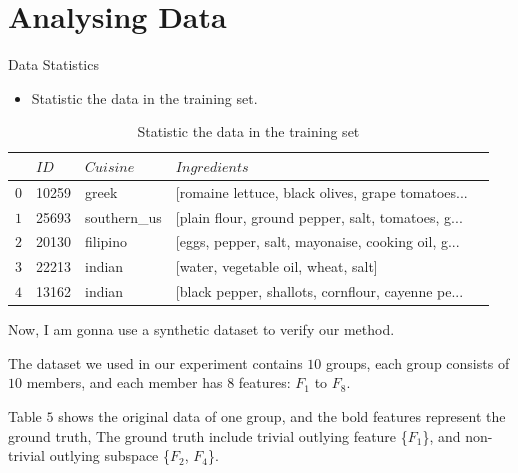 \documentclass[
 size=14pt,
 paper=smartboard,  %
 mode=present, 		%
 display=slides, 	%
 style=tuliplab,  	%
 pauseslide,
 fleqn,leqno]{powerdot}
\begin{document}
\section{Analysing Data}


\begin{slide}{Data Statistics}

  \begin{itemize}
  \item Statistic the data in the training set.
  \end{itemize}
  
  \begin{table}
  \setlength{\abovecaptionskip}{0pt}
  \setlength{\belowcaptionskip}{10pt}
  \centering
  \caption{Statistic the data in the training set}
  
  \begin{tabular}{p{0.5cm}p{2.1cm}p{2.5cm}p{10.2cm}p{2.2cm}}
  \hline
      & $ID$ & $Cuisine$ & $Ingredients$  \\
  \hline
    $0$   & 10259 & greek  & [romaine lettuce, black olives, grape tomatoes... \\
    $1$   & 25693  & southern_us  & [plain flour, ground pepper, salt, tomatoes, g... \\
    $2$   & 20130  & filipino & [eggs, pepper, salt, mayonaise, cooking oil, g... \\
    $3$   & 22213  & indian  & [water, vegetable oil, wheat, salt] \\
    $4$   & 13162    & indian  & [black pepper, shallots, cornflour, cayenne pe... \\
   
    
  \hline
  \end{tabular}
  \end{table}
  
  \begin{note}
  Now,
  I am gonna use a synthetic dataset to verify our method.
  
  The dataset we used in our experiment contains $10$ groups,
  each group consists of $10$ members,
  and each member has $8$ features: $F_1$ to $F_8$.
  
  Table $5$ shows the original data of one group,
  and the bold features represent the ground truth,
  The ground truth include trivial outlying feature \{$F_1$\},
  and non-trivial outlying subspace \{$F_2$, $F_4$\}.
  \end{note}
  
  \end{slide}
  
\end{document}
